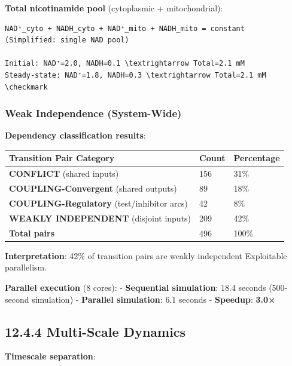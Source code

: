 \textbf{Total nicotinamide pool} (cytoplasmic + mitochondrial):

\begin{lstlisting}
NAD⁺_cyto + NADH_cyto + NAD⁺_mito + NADH_mito = constant
(Simplified: single NAD pool)

Initial: NAD⁺=2.0, NADH=0.1 \textrightarrow Total=2.1 mM
Steady-state: NAD⁺=1.8, NADH=0.3 \textrightarrow Total=2.1 mM \checkmark
\end{lstlisting}

\hypertarget{weak-independence-system-wide}{%
\subsubsection{Weak Independence
(System-Wide)}\label{weak-independence-system-wide}}

\textbf{Dependency classification results}:

\begin{longtable}[]{@{}lll@{}}
\toprule\noalign{}
Transition Pair Category & Count & Percentage \\
\midrule\noalign{}
\endhead
\bottomrule\noalign{}
\endlastfoot
\textbf{CONFLICT} (shared inputs) & 156 & 31\% \\
\textbf{COUPLING-Convergent} (shared outputs) & 89 & 18\% \\
\textbf{COUPLING-Regulatory} (test/inhibitor arcs) & 42 & 8\% \\
\textbf{WEAKLY INDEPENDENT} (disjoint inputs) & 209 & 42\% \\
\textbf{Total pairs} & 496 & 100\% \\
\end{longtable}

\textbf{Interpretation}: 42\% of transition pairs are weakly independent
\textrightarrow Exploitable parallelism.

\textbf{Parallel execution} (8 cores): - \textbf{Sequential simulation}:
18.4 seconds (500-second simulation) - \textbf{Parallel simulation}: 6.1
seconds - \textbf{Speedup}: \textbf{3.0×} \checkmark

\hypertarget{multi-scale-dynamics}{%
\subsection{12.4.4 Multi-Scale Dynamics}\label{multi-scale-dynamics}}

\textbf{Timescale separation}:

